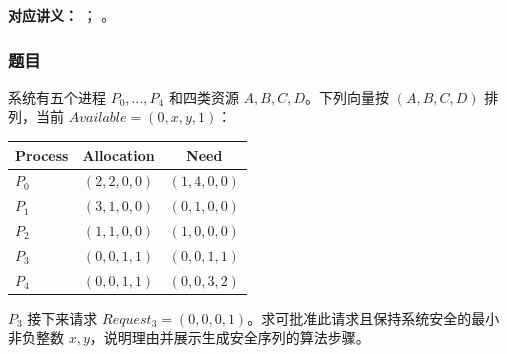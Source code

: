 
\textbf{对应讲义：}
；
。

\subsubsection*{题目}

系统有五个进程 $P_0,\ldots,P_4$ 和四类资源 $A,B,C,D$。下列向量按 $(A,B,C,D)$ 排列，当前 $Available=(0,x,y,1)$：
\begin{center}
\begin{tabular}{@{}lcc@{}}
  \toprule
  Process & Allocation & Need \\
  \midrule
  $P_0$ & $(2,2,0,0)$ & $(1,4,0,0)$ \\
  $P_1$ & $(3,1,0,0)$ & $(0,1,0,0)$ \\
  $P_2$ & $(1,1,0,0)$ & $(1,0,0,0)$ \\
  $P_3$ & $(0,0,1,1)$ & $(0,0,1,1)$ \\
  $P_4$ & $(0,0,1,1)$ & $(0,0,3,2)$ \\
  \bottomrule
\end{tabular}
\end{center}
$P_3$ 接下来请求 $Request_3=(0,0,0,1)$。求可批准此请求且保持系统安全的最小非负整数 $x,y$，说明理由并展示生成安全序列的算法步骤。

